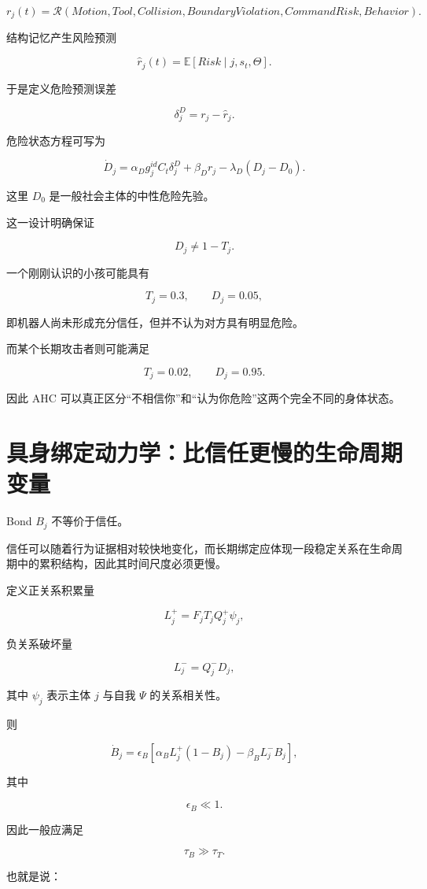 \[
r_j(t)
=
\mathcal R
\left(
Motion,
Tool,
Collision,
BoundaryViolation,
CommandRisk,
Behavior
\right).
\]

结构记忆产生风险预测

\[
\hat r_j(t)
=
\mathbb E
\left[
Risk
\mid
j,s_t,\Theta
\right].
\]

于是定义危险预测误差

\[
\delta_j^D
=
r_j-\hat r_j.
\]

危险状态方程可写为

\[
\boxed{
\dot D_j
=
\alpha_D
g_j^{id}
C_t
\delta_j^D
+
\beta_Dr_j
-
\lambda_D(D_j-D_0).
}
\]

这里 $D_0$ 是一般社会主体的中性危险先验。

这一设计明确保证

\[
D_j\neq1-T_j.
\]

一个刚刚认识的小孩可能具有

\[
T_j=0.3,
\qquad
D_j=0.05,
\]

即机器人尚未形成充分信任，但并不认为对方具有明显危险。

而某个长期攻击者则可能满足

\[
T_j=0.02,
\qquad
D_j=0.95.
\]

因此 AHC 可以真正区分“不相信你”和“认为你危险”这两个完全不同的身体状态。


\section{具身绑定动力学：比信任更慢的生命周期变量}

Bond $B_j$ 不等价于信任。

信任可以随着行为证据相对较快地变化，而长期绑定应体现一段稳定关系在生命周期中的累积结构，因此其时间尺度必须更慢。

定义正关系积累量

\[
L_j^+
=
F_j
T_j
Q_j^+
\psi_j,
\]

负关系破坏量

\[
L_j^-
=
Q_j^-
D_j,
\]

其中 $\psi_j$ 表示主体 $j$ 与自我 $\Psi$ 的关系相关性。

则

\[
\boxed{
\dot B_j
=
\epsilon_B
\left[
\alpha_B
L_j^+
(1-B_j)
-
\beta_B
L_j^-B_j
\right],
}
\]

其中

\[
\epsilon_B\ll1.
\]

因此一般应满足

\[
\tau_B\gg\tau_T.
\]

也就是说：

